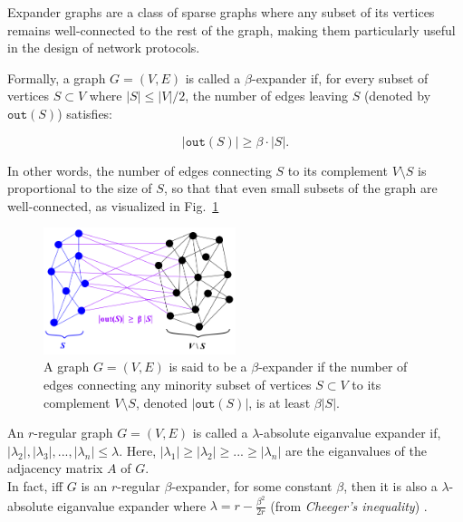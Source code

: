 Expander graphs are a class of sparse graphs where any subset of its vertices remains well-connected to the rest of the graph, making them particularly useful in the design of network protocols.

\begin{definition}  \label{def:beta-expander}
    Formally, a graph $G = (V, E)$ is called a $\beta$-expander if, for every subset of vertices $S \subset V$ where $|S| \leq |V|/2$, the number of edges leaving $S$ (denoted by $\texttt{out}(S)$) satisfies:
    
    $$
    |\texttt{out}(S)| \geq \beta \cdot |S|.
    $$
    
    In other words, the number of edges connecting $S$ to its complement $V \setminus S$ is proportional to the size of $S$, so that that even small subsets of the graph are well-connected, as visualized in Fig.~\ref{fig:beta-expander}\\

    \begin{figure}
        \centering
        \includegraphics[width=0.5\textwidth]{template/figures/Expander graph.png}
        \caption{A graph $G = (V, E)$ is said to be a $\beta$-expander if the number of edges connecting any minority subset of vertices $S \subset V$ to its complement $V \setminus S$, denoted $|\texttt{out}(S)|$, is at least $\beta |S|$.}
        \label{fig:beta-expander}
    \end{figure}

\end{definition}

\begin{definition}  \label{def:eiganvalue-expander}
     An $r$-regular graph $G = (V, E)$ is called a $\lambda$-absolute eiganvalue expander if, $|\lambda_2|,|\lambda_3|,...,|\lambda_n| \leq \lambda$. Here, $|\lambda_1| \geq |\lambda_2| \geq ... \geq |\lambda_n|$ are the eiganvalues of the adjacency matrix $A$ of $G$.\\

     In fact, iff $G$ is an $r$-regular $\beta$-expander, for some constant $\beta$, then it is also a $\lambda$-absolute eiganvalue expander where $\lambda = r - \frac{\beta^2}{2r}$ (from \textit{Cheeger's inequality})
     .
\end{definition}

